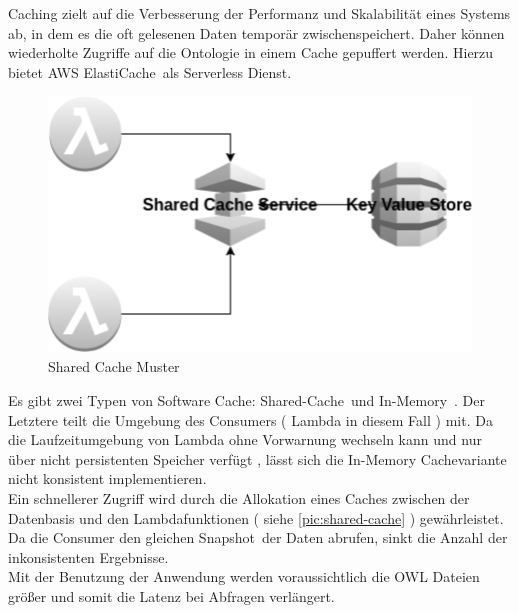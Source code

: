 \documentclass[
12pt,
english,
ngerman,
headsepline,
twoside,
openright,
numbers=noenddot,version=first
]{scrreprt}
\begin{document}
Caching zielt auf die Verbesserung der Performanz und Skalabilität eines Systems ab, in dem es die oft gelesenen Daten temporär zwischenspeichert. Daher können wiederholte Zugriffe auf die Ontologie in einem Cache gepuffert werden. Hierzu bietet \acrshort{AWS} \glqq ElastiCache\grqq\ als Serverless Dienst. 
\begin{figure}[h]
	\begin{center}
\includegraphics[scale=0.60]{./pics/aws/pattern-cache-shared.eps}	
\caption{Shared Cache Muster}	
\label{pic:shared-cache}
	\end{center}
\end{figure}
Es gibt zwei Typen von Software Cache: \glqq Shared-Cache\grqq\ und \glqq In-Memory\grqq\ \cite{patternsCloud}. Der Letztere teilt die Umgebung des Consumers ( Lambda in diesem Fall ) mit. Da die Laufzeitumgebung von Lambda ohne Vorwarnung wechseln kann und nur über nicht persistenten Speicher verfügt \cite{lambdaFaq}, lässt sich die In-Memory Cachevariante nicht konsistent implementieren.\\

Ein schnellerer Zugriff wird durch die Allokation eines Caches zwischen der Datenbasis und den Lambdafunktionen ( siehe \autoref{pic:shared-cache} ) gewährleistet. Da die Consumer den gleichen \glqq Snapshot\grqq\ der Daten abrufen, sinkt die Anzahl der inkonsistenten Ergebnisse.\cite{patternsCloud}\\

Mit der Benutzung der Anwendung werden voraussichtlich die \acrshort{OWL} Dateien größer und somit die Latenz bei Abfragen verlängert.
\end{document}

